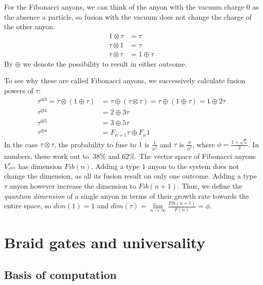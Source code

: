 \documentclass{article}
\begin{document}
For the Fibonacci anyons, we can think of the anyon with the vacuum charge $0$ as the absence a particle, so fusion with the vacuum does not change the charge of the other anyon. 
\begin{align*}
  1 \otimes \tau &= \tau \\
  \tau \otimes 1 &= \tau \\
  \tau \otimes \tau &= 1 \oplus \tau
\end{align*}
By $\oplus$ we denote the possibility to result in either outcome. 

To see why these are called Fibonacci anyons, we successively calculate fusion powers of $\tau$:
\begin{align*}
  \tau^{\otimes 3} = \tau \otimes (1 \oplus \tau) 
  &= \tau \oplus (\tau \otimes \tau) 
  = \tau \oplus (1 \oplus \tau) 
  = 1 \oplus 2 \tau \\
  \tau^{\otimes 4} &= 2 \oplus 3\tau \\
  \tau^{\otimes 5} &= 3 \oplus 5\tau \\
  \tau^{\otimes n} &= F_{n+1} \tau \oplus F_{n} 1
\end{align*}
In the case $\tau \otimes \tau$, the probability to fuse to $1$ is $\frac{1}{\phi^2}$ and $\tau$ is $\frac{\phi}{\phi^2}$, where $\phi = \frac{1 + \sqrt{5 } }{2}$. In numbers, these work out to $~38\%$ and $62\%$. The vector space of Fibonacci anyons $V_{\tau^{\otimes n}}^{\tau}$ has dimension $Fib(n)$. Adding a type $1$ anyon to the system does not change the dimension, as all its fusion result on only one outcome. Adding a type $\tau$ anyon however increase the dimension to $Fib(n+1)$. Thus, we define the {\it quantum dimension} of a single anyon in terms of their growth rate towards the entire space, so $dim(1) = 1$ and $dim(\tau) = \lim\limits_{n \to \infty} \frac{Fib(n+1)}{F(n)} = \phi$.


\section{Braid gates and universality}
\label{BraidGatesAndUniversality}

\subsection{Basis of computation}
\end{document}

